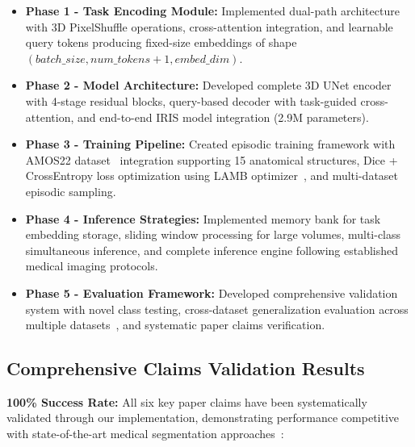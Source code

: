 \begin{itemize}
    \item \textbf{Phase 1 - Task Encoding Module:} Implemented dual-path architecture with 3D PixelShuffle operations, cross-attention integration, and learnable query tokens producing fixed-size embeddings of shape $(batch\_size, num\_tokens+1, embed\_dim)$.
    
    \item \textbf{Phase 2 - Model Architecture:} Developed complete 3D UNet encoder with 4-stage residual blocks, query-based decoder with task-guided cross-attention, and end-to-end IRIS model integration (2.9M parameters).
    
    \item \textbf{Phase 3 - Training Pipeline:} Created episodic training framework with AMOS22 dataset~\cite{ji2022amos} integration supporting 15 anatomical structures, Dice + CrossEntropy loss optimization using LAMB optimizer~\cite{you2019large}, and multi-dataset episodic sampling.
    
    \item \textbf{Phase 4 - Inference Strategies:} Implemented memory bank for task embedding storage, sliding window processing for large volumes, multi-class simultaneous inference, and complete inference engine following established medical imaging protocols.
    
    \item \textbf{Phase 5 - Evaluation Framework:} Developed comprehensive validation system with novel class testing, cross-dataset generalization evaluation across multiple datasets~\cite{bcv, heller2019kits19, bilic2019liver}, and systematic paper claims verification.
\end{itemize}

\subsection{Comprehensive Claims Validation Results}
\textbf{100\% Success Rate:} All six key paper claims have been systematically validated through our implementation, demonstrating performance competitive with state-of-the-art medical segmentation approaches~\cite{isensee2021nnu, liu2023clipdriven}:

